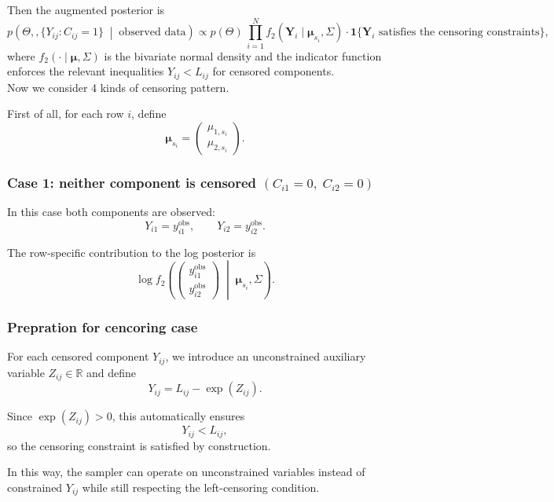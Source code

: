 \documentclass[12pt]{article}
\begin{document}
Then the augmented posterior is
\[
p\!\left(
\Theta, , \{Y_{ij}: C_{ij}=1\}
\;\middle|\;
\text{observed data}
\right)
\propto
p(\Theta)\,
\prod_{i=1}^N
f_2(\mathbf{Y}_i\mid \boldsymbol{\mu}_{s_i},\Sigma)
\cdot
\mathbf{1}\{\mathbf{Y}_i \text{ satisfies the censoring constraints}\},
\]
where \(f_2(\cdot\mid \boldsymbol{\mu},\Sigma)\) is the bivariate normal density and the indicator function enforces the relevant inequalities \(Y_{ij}<L_{ij}\) for censored components.\\


Now we consider 4 kinds of censoring pattern.

First of all, for each row \(i\), define
\[
\boldsymbol{\mu}_{s_i}
=
\begin{pmatrix}
\mu_{1,s_i}\\
\mu_{2,s_i}
\end{pmatrix}.
\]


\subsubsection*{Case 1: neither component is censored \((C_{i1}=0,\; C_{i2}=0)\)}

In this case both components are observed:
\[
Y_{i1}=y_{i1}^{\mathrm{obs}},\qquad
Y_{i2}=y_{i2}^{\mathrm{obs}}.
\]

The row-specific contribution to the log posterior is
\[
\log f_2
\left(
\begin{pmatrix}
y_{i1}^{\mathrm{obs}}\\
y_{i2}^{\mathrm{obs}}
\end{pmatrix}
\;\middle|\;
\boldsymbol{\mu}_{s_i},\Sigma
\right).
\]


\subsubsection*{Prepration for cencoring case}
For each censored component \(Y_{ij}\), we introduce an unconstrained auxiliary variable \(Z_{ij}\in\mathbb{R}\) and define
\[
Y_{ij}=L_{ij}-\exp(Z_{ij}).
\]

Since \(\exp(Z_{ij})>0\), this automatically ensures
\[
Y_{ij}<L_{ij},
\]
so the censoring constraint is satisfied by construction.

In this way, the sampler can operate on unconstrained variables instead of constrained $Y_{ij}$ while still respecting the left-censoring condition.
\end{document}
